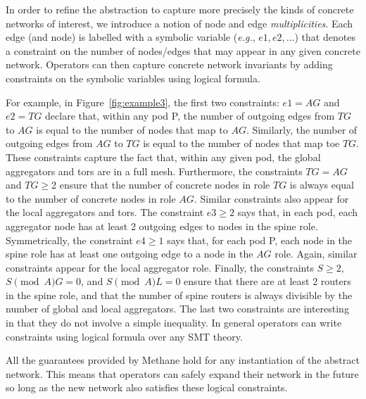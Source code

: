 \documentclass{sig-alternate-10pt}
\newcommand{\EG}{\emph{e.g.}}
\newcommand{\sysname}{{\small \sf Methane}\xspace}
\begin{document}
In order to refine the abstraction to capture more precisely the kinds of concrete networks of interest,
we introduce a notion of node and edge \emph{multiplicities}. Each edge (and node) is labelled
with a symbolic variable (\EG, $e1, e2, \ldots$) that denotes a constraint on the number of nodes/edges
that may appear in any given concrete network. Operators can then capture concrete network invariants by adding constraints on the symbolic variables using logical formula.

For example, in Figure~\ref{fig:example3}, the first two constraints: $e1 = AG$ and $e2 = TG$ declare that, within any pod P, the number of outgoing edges from $TG$ to $AG$ is equal to the number of nodes that map to $AG$. Similarly, the number of outgoing edges from $AG$ to $TG$ is equal to the number of nodes that map toe $TG$. These constraints capture the fact that, within any given pod, the global aggregators and tors are in a full mesh. Furthermore, the constraints $TG = AG$ and $TG \geq 2$ ensure that the number of concrete nodes in role $TG$ is always equal to the number of concrete nodes in role $AG$. Similar constraints also appear for the local aggregators and tors.
%
The constraint $e3 \geq 2$ says that, in each pod, each aggregator node has at least 2 outgoing edges to nodes in the spine role. Symmetrically, the constraint $e4 \geq 1$ says that, for each pod P, each node in the spine role has at least one outgoing edge to a node in the $AG$ role. Again, similar constraints appear for the local aggregator role. Finally, the constraints $S \geq 2$, $S \pmod AG = 0$, and $S \pmod AL = 0$ ensure that there are at least 2 routers in the spine role, and that the number of spine routers is always divisible by the number of global and local aggregators.
%
The last two constraints are interesting in that they do not involve a simple inequality. In general operators can write constraints using logical formula over any SMT theory. 

All the guarantees provided by \sysname hold for any instantiation of the abstract network. This means that operators can safely expand their network in the future so long as the new network also satisfies these logical constraints.



%
\end{document}
